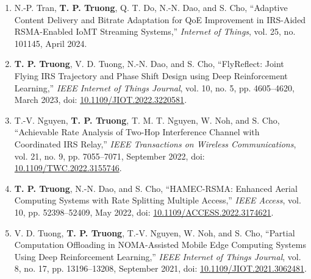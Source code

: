 \documentclass[10pt,letterpaper]{article}
\begin{document}
\begin{enumerate}[leftmargin=*, itemsep=0.22em, topsep=0.25em]
  \item N.-P. Tran, \textbf{T. P. Truong}, Q. T. Do, N.-N. Dao, and S. Cho, ``Adaptive Content Delivery and Bitrate Adaptation for QoE Improvement in IRS-Aided RSMA-Enabled IoMT Streaming Systems,'' \textit{Internet of Things}, vol. 25, no. 101145, April 2024.
  \item \textbf{T. P. Truong}, V. D. Tuong, N.-N. Dao, and S. Cho, ``FlyReflect: Joint Flying IRS Trajectory and Phase Shift Design using Deep Reinforcement Learning,'' \textit{IEEE Internet of Things Journal}, vol. 10, no. 5, pp. 4605--4620, March 2023, doi: \href{https://doi.org/10.1109/JIOT.2022.3220581}{10.1109/JIOT.2022.3220581}.
  \item T.-V. Nguyen, \textbf{T. P. Truong}, T. M. T. Nguyen, W. Noh, and S. Cho, ``Achievable Rate Analysis of Two-Hop Interference Channel with Coordinated IRS Relay,'' \textit{IEEE Transactions on Wireless Communications}, vol. 21, no. 9, pp. 7055--7071, September 2022, doi: \href{https://doi.org/10.1109/TWC.2022.3155746}{10.1109/TWC.2022.3155746}.
  \item \textbf{T. P. Truong}, N.-N. Dao, and S. Cho, ``HAMEC-RSMA: Enhanced Aerial Computing Systems with Rate Splitting Multiple Access,'' \textit{IEEE Access}, vol. 10, pp. 52398--52409, May 2022, doi: \href{https://doi.org/10.1109/ACCESS.2022.3174621}{10.1109/ACCESS.2022.3174621}.
  \item V. D. Tuong, \textbf{T. P. Truong}, T.-V. Nguyen, W. Noh, and S. Cho, ``Partial Computation Offloading in NOMA-Assisted Mobile Edge Computing Systems Using Deep Reinforcement Learning,'' \textit{IEEE Internet of Things Journal}, vol. 8, no. 17, pp. 13196--13208, September 2021, doi: \href{https://doi.org/10.1109/JIOT.2021.3062481}{10.1109/JIOT.2021.3062481}.
\end{enumerate}
\end{document}
